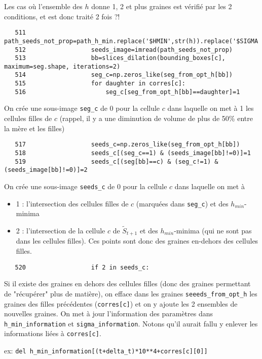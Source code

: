 \documentclass{article}
\def \mycolor {red}
\begin{document}
Les cas o\`u l'ensemble des $h$ donne 1, 2 et plus graines est v\'erifi\'e par les 2 conditions, et est donc trait\'e 2 fois ?!
\color{black}
\begin{verbatim} 
   511	                path_seeds_not_prop=path_h_min.replace('$HMIN',str(h)).replace('$SIGMA',str(sigma));
   512	                seeds_image=imread(path_seeds_not_prop)
   513	                bb=slices_dilation(bounding_boxes[c], maximum=seg.shape, iterations=2)
   514	                seg_c=np.zeros_like(seg_from_opt_h[bb])
   515	                for daughter in corres[c]:
   516	                    seg_c[seg_from_opt_h[bb]==daughter]=1
\end{verbatim} 
\color{\mycolor}
On cr\'ee une sous-image \verb|seg_c| de 0 pour la cellule $c$ dans laquelle on met \`a 1 les cellules filles de $c$ (rappel, il y a une diminution de volume de plus de 50\% entre la m\`ere et les filles) 
\color{black}
\begin{verbatim} 
   517	                seeds_c=np.zeros_like(seg_from_opt_h[bb])
   518	                seeds_c[(seg_c==1) & (seeds_image[bb]!=0)]=1
   519	                seeds_c[(seg[bb]==c) & (seg_c!=1) & (seeds_image[bb]!=0)]=2
\end{verbatim} 
\color{\mycolor}
On cr\'ee une sous-image \verb|seeds_c| de 0 pour la cellule $c$ dans laquelle on met \`a 
\begin{itemize}
\itemsep -0.5ex
\item 1 : l'intersection des cellules filles de $c$ (marqu\'ees dans \verb|seg_c|) et des $h_{min}$-minima
\item 2  : l'intersection de la cellule $c$ de $\tilde{S}_{t+1}$ et des $h_{min}$-minima (qui ne sont pas dans les cellules filles). Ces points sont donc des graines en-dehors des cellules filles.
\end{itemize}
\color{black}
\begin{verbatim} 
   520	                if 2 in seeds_c:
\end{verbatim} 
\color{\mycolor}
Si il existe des graines en dehors des cellules filles (donc des graines permettant de "r\'ecup\'erer" plus de mati\`ere),
on efface dans les graines  \verb|seeeds_from_opt_h| les graines des filles pr\'ec\'edentes (\verb|corres[c]|) et on y ajoute les 2 ensembles de nouvelles graines. On met \`a jour l'information des param\`etres dans \verb|h_min_information| et \verb|sigma_information|. Notons qu'il aurait fallu y enlever les informations li\'ees \`a \verb|corres[c]|.

ex: \verb|del h_min_information[(t+delta_t)*10**4+corres[c][0]]|
\end{document}
